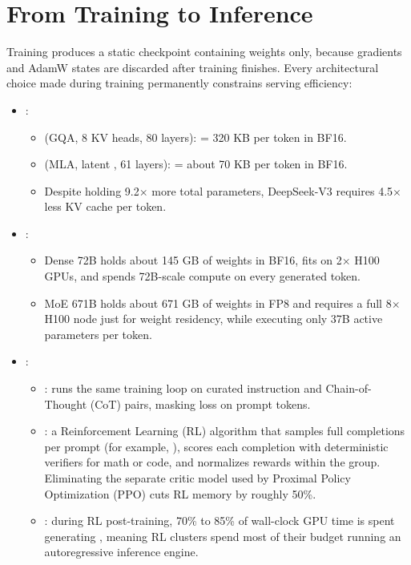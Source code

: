 \section{From Training to Inference}

Training produces a static checkpoint containing weights only, because gradients and AdamW states are discarded after training finishes. Every architectural choice made during training permanently constrains serving efficiency:

\begin{itemize}
    \item {}:
    \begin{itemize}
        \item {} (GQA, 8 KV heads, 80 layers):  = 320 KB per token in BF16.
        \item {} (MLA, latent , 61 layers):  = about 70 KB per token in BF16.
        \item Despite holding 9.2$\times$ more total parameters, DeepSeek-V3 requires 4.5$\times$ less KV cache per token.
    \end{itemize}
    \item {}:
    \begin{itemize}
        \item Dense 72B holds about 145 GB of weights in BF16, fits on 2$\times$ H100 GPUs, and spends 72B-scale compute on every generated token.
        \item MoE 671B holds about 671 GB of weights in FP8 and requires a full 8$\times$ H100 node just for weight residency, while executing only 37B active parameters per token.
    \end{itemize}
    \item {}:
    \begin{itemize}
        \item {}: runs the same training loop on curated instruction and Chain-of-Thought (CoT) pairs, masking loss on prompt tokens.
        \item {}: a Reinforcement Learning (RL) algorithm that samples  full completions per prompt (for example, ), scores each completion with deterministic verifiers for math or code, and normalizes rewards within the group. Eliminating the separate critic model used by Proximal Policy Optimization (PPO) cuts RL memory by roughly 50\%.
        \item {}: during RL post-training, 70\% to 85\% of wall-clock GPU time is spent generating , meaning RL clusters spend most of their budget running an autoregressive inference engine.
    \end{itemize}
\end{itemize}
